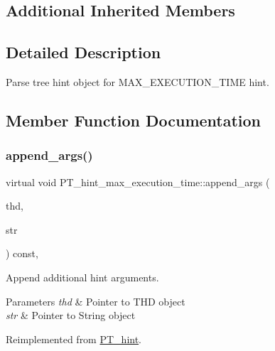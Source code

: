 \subsection*{Additional Inherited Members}


\subsection{Detailed Description}
Parse tree hint object for M\+A\+X\+\_\+\+E\+X\+E\+C\+U\+T\+I\+O\+N\+\_\+\+T\+I\+ME hint. 

\subsection{Member Function Documentation}
\mbox{\label{classPT__hint__max__execution__time_a5062df4e31c3ddc7a6d3b17166c7cfd1}} 
\subsubsection{\texorpdfstring{append\+\_\+args()}{append\_args()}}
{\footnotesize\ttfamily virtual void P\+T\+\_\+hint\+\_\+max\+\_\+execution\+\_\+time\+::append\+\_\+args (\begin{DoxyParamCaption}\item[{T\+HD $\ast$}]{thd,  }\item[{String $\ast$}]{str }\end{DoxyParamCaption}) const\hspace{0.3cm}{\ttfamily [inline]}, {\ttfamily [virtual]}}

Append additional hint arguments.


\begin{DoxyParams}{Parameters}
{\em thd} & Pointer to T\+HD object \\
\hline
{\em str} & Pointer to String object \\
\hline
\end{DoxyParams}


Reimplemented from \mbox{\hyperlink{classPT__hint_afd39b4eeed47d9b1790f12c144aece7d}{P\+T\+\_\+hint}}.

\mbox{\label{classPT__hint__max__execution__time_a7d073143038eaf1eddc87b1c49f6c5aa}} 
